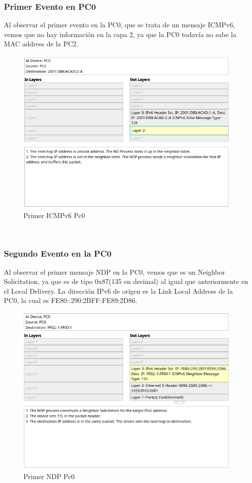 \documentclass[a4paper,12pt]{article}
\begin{document}
\subsubsection{Primer Evento en PC0}
Al observar el primer evento en la PC0, que se trata de un mensaje ICMPv6, vemos que no hay información en la capa 2, ya que la PC0 todavía no sabe la MAC address de la PC2.\\
\begin{figure}[h]
    \centering
    \includegraphics[width=1\textwidth]{imagenes/1.png}
    \caption{Primer ICMPv6 Pc0}
\end{figure}\\
\subsubsection{Segundo Evento en la PC0}
Al observar el primer mensaje NDP en la PC0, vemos que es un Neighbor Solicitation, ya que es de tipo 0x87(135 en decimal) al igual que anteriormente en el Local Delivery. La dirección IPv6 de origen es la Link Local Address de la PC0, la cual es FE80::290:2BFF:FE89:2D86.\\
\begin{figure}[h]
    \centering
    \includegraphics[width=1\textwidth]{imagenes/2.png}
    \caption{Primer NDP Pc0}
\end{figure}\\
\end{document}
